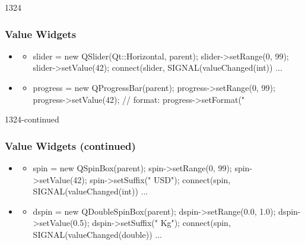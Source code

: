 \begin{slide}[fragile]{1324}
  \frametitle{Value Widgets}
 \begin{itemize}
  \item \textbf{}
    \begin{itemize}
    \item[]
      \begin{cpp}
slider = new QSlider(Qt::Horizontal, parent);
slider->setRange(0, 99);
slider->setValue(42);
connect(slider, SIGNAL(valueChanged(int)) ...
      \end{cpp}
    \end{itemize}
  \item \textbf{}
    \begin{itemize}
    \item[]
      \begin{cpp}
progress = new QProgressBar(parent);
progress->setRange(0, 99);
progress->setValue(42);
// format: %
progress->setFormat("%
    \end{cpp}
   \end{itemize}
 \end{itemize}
\end{slide}

\begin{slide}[fragile]{1324-continued}
  \frametitle{Value Widgets (continued)}
 \begin{itemize}
 \item \textbf{}
   \begin{itemize}
    \item[]
      \begin{cpp}
spin = new QSpinBox(parent);
spin->setRange(0, 99);
spin->setValue(42);
spin->setSuffix(" USD");
connect(spin, SIGNAL(valueChanged(int)) ...
      \end{cpp}
  \end{itemize}
 \item \textbf{}
   \begin{itemize}
    \item[]
      \begin{cpp}
dspin = new QDoubleSpinBox(parent);
dspin->setRange(0.0, 1.0);
dspin->setValue(0.5);
dspin->setSuffix(" Kg");
connect(spin, SIGNAL(valueChanged(double)) ...
      \end{cpp}
  \end{itemize} \end{itemize}
\end{slide}


